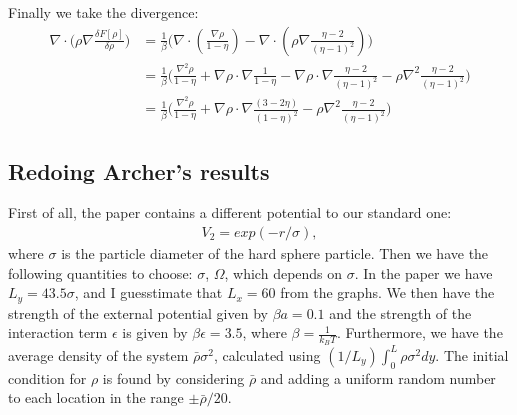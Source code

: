 \documentclass[11pt, a4paper]{article}
\theoremstyle{definition}
\begin{document}
	Finally we take the divergence:
	\begin{align*}
	\nabla \cdot \bigg(\rho \nabla \frac{\delta F[\rho]}{\delta \rho}\bigg) &= \frac{1}{\beta} \bigg( \nabla  \cdot \left(  \frac{\nabla \rho}{1 - \eta} \right) - \nabla  \cdot \left(\rho \nabla\frac{\eta - 2}{(\eta - 1)^2} \right) \bigg)\\
	&= \frac{1}{\beta} \bigg( \frac{\nabla^2 \rho}{1 - \eta} +  \nabla \rho \cdot \nabla \frac{1}{1 - \eta} - \nabla \rho \cdot \nabla \frac{\eta - 2}{(\eta - 1)^2} - \rho \nabla^2\frac{\eta - 2}{(\eta - 1)^2} \bigg)\\
	&= \frac{1}{\beta} \bigg( \frac{\nabla^2 \rho}{1 - \eta} +  \nabla \rho \cdot \nabla \frac{(3- 2 \eta)}{(1 - \eta)^2}  - \rho \nabla^2\frac{\eta - 2}{(\eta - 1)^2} \bigg)
	\end{align*}
	
\subsection{Redoing Archer's results}
	First of all, the paper contains a different potential to our standard one:
	\begin{align*}
	V_2 = exp(-r/\sigma),
	\end{align*}
	where $\sigma$ is the particle diameter of the hard sphere particle.
	Then we have the following quantities to choose:
	$\sigma$, $\Omega$, which depends on $\sigma$. In the paper we have $L_y = 43.5 \sigma$, and I guesstimate that $L_x = 60$ from the graphs. 
	We then have the strength of the external potential given by $\beta a = 0.1$ and the strength of the interaction term $\epsilon$ is given by $\beta \epsilon = 3.5$, where $\beta = \frac{1}{k_BT}$. 
	Furthermore, we have the average density of the system $\bar \rho \sigma^2$, calculated using $(1/L_y)\int_0^L \rho \sigma^2 dy$.
	The initial condition for $\rho$ is found by considering $\bar \rho$ and adding a uniform random number to each location in the range $\pm \bar \rho/ 20$.
\end{document}
